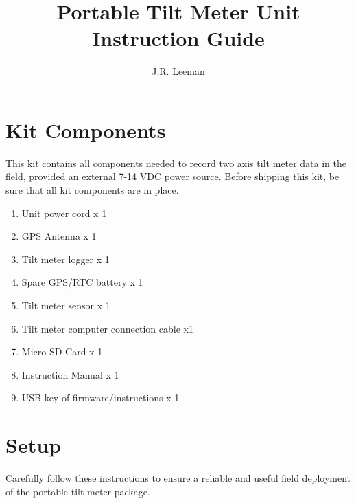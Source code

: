 \documentclass[11pt]{article} %
\title{Portable Tilt Meter Unit Instruction Guide}
\author{J.R. Leeman}
\date{} %
\begin{document}
\maketitle

\section{Kit Components}

This kit contains all components needed to record two axis tilt meter data in the field, provided an external 7-14 VDC power source. Before shipping this kit, be sure that all kit components are in place.

\begin{enumerate}
\item Unit power cord x 1
\item GPS Antenna x 1
\item Tilt meter logger x 1
\item Spare GPS/RTC battery x 1
\item Tilt meter sensor x 1
\item Tilt meter computer connection cable x1
\item Micro SD Card x 1
\item Instruction Manual x 1
\item USB key of firmware/instructions x 1
\end{enumerate}

\section{Setup}
Carefully follow these instructions to ensure a reliable and useful field deployment of the portable tilt meter package. 
\end{document}
